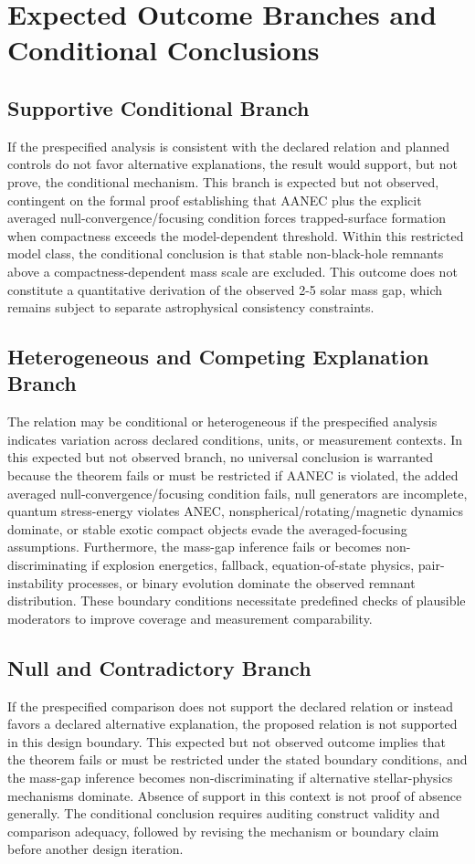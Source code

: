 \documentclass[conference]{IEEEtran}
\begin{document}
\section{Expected Outcome Branches and Conditional Conclusions}
\subsection{Supportive Conditional Branch}
If the prespecified analysis is consistent with the declared relation and planned controls do not favor alternative explanations, the result would support, but not prove, the conditional mechanism. This branch is expected but not observed, contingent on the formal proof establishing that AANEC plus the explicit averaged null-convergence/focusing condition forces trapped-surface formation when compactness exceeds the model-dependent threshold. Within this restricted model class, the conditional conclusion is that stable non-black-hole remnants above a compactness-dependent mass scale are excluded. This outcome does not constitute a quantitative derivation of the observed 2-5 solar mass gap, which remains subject to separate astrophysical consistency constraints.

\subsection{Heterogeneous and Competing Explanation Branch}
The relation may be conditional or heterogeneous if the prespecified analysis indicates variation across declared conditions, units, or measurement contexts. In this expected but not observed branch, no universal conclusion is warranted because the theorem fails or must be restricted if AANEC is violated, the added averaged null-convergence/focusing condition fails, null generators are incomplete, quantum stress-energy violates ANEC, nonspherical/rotating/magnetic dynamics dominate, or stable exotic compact objects evade the averaged-focusing assumptions. Furthermore, the mass-gap inference fails or becomes non-discriminating if explosion energetics, fallback, equation-of-state physics, pair-instability processes, or binary evolution dominate the observed remnant distribution. These boundary conditions necessitate predefined checks of plausible moderators to improve coverage and measurement comparability.

\subsection{Null and Contradictory Branch}
If the prespecified comparison does not support the declared relation or instead favors a declared alternative explanation, the proposed relation is not supported in this design boundary. This expected but not observed outcome implies that the theorem fails or must be restricted under the stated boundary conditions, and the mass-gap inference becomes non-discriminating if alternative stellar-physics mechanisms dominate. Absence of support in this context is not proof of absence generally. The conditional conclusion requires auditing construct validity and comparison adequacy, followed by revising the mechanism or boundary claim before another design iteration.
\end{document}
